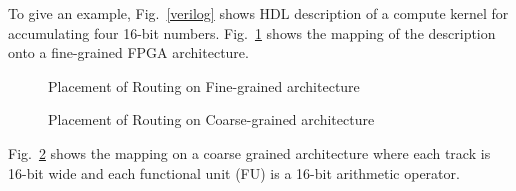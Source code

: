 To give an example, Fig.~\ref*{verilog} shows HDL description of a compute kernel for accumulating four 16-bit numbers.
Fig.~\ref*{par_fine} shows the mapping of the description onto a fine-grained FPGA architecture.


%

\begin{figure}[!h]
	\centering
	\caption{Placement of Routing on Fine-grained architecture} %
	\label{par_fine}
\end{figure}


\begin{figure}[!h]
	\centering
	\caption{Placement of Routing on Coarse-grained architecture} %
	\label{par_cg}
\end{figure}

Fig.~\ref*{par_cg} shows the mapping on a coarse grained architecture where each track is 16-bit wide and each functional unit (FU) is a 16-bit arithmetic operator.

